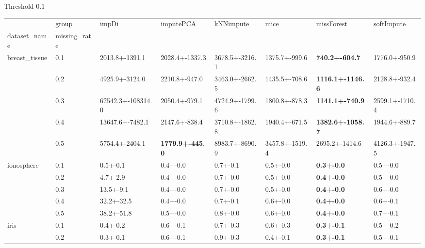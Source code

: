 

 Threshold 0.1 
 \begin{tabular}{llllllll}
\toprule
     & group &              impDi &               imputePCA &       kNNimpute &            mice &               missForest &      softImpute \\
dataset_name & missing_rate &                    &                         &                 &                 &                          &                 \\
\midrule
breast_tissue & 0.1 &     2013.8+-1391.1 &          2028.4+-1337.3 &  3678.5+-3216.1 &   1375.7+-999.6 &    \textbf{740.2+-604.7} &   1776.0+-950.9 \\
     & 0.2 &     4925.9+-3124.0 &           2210.8+-947.0 &  3463.0+-2662.5 &   1435.5+-708.6 &  \textbf{1116.1+-1146.6} &   2128.8+-932.4 \\
     & 0.3 &  62542.3+-108314.0 &           2050.4+-979.1 &  4724.9+-1799.6 &   1800.8+-878.3 &   \textbf{1141.1+-740.9} &  2599.1+-1710.4 \\
     & 0.4 &    13647.6+-7482.1 &           2147.6+-838.4 &  3710.8+-1862.8 &   1940.4+-671.5 &  \textbf{1382.6+-1058.7} &   1944.6+-889.7 \\
     & 0.5 &     5754.4+-2404.1 &  \textbf{1779.9+-445.0} &  8983.7+-8690.9 &  3457.8+-1519.4 &           2695.2+-1414.6 &  4126.3+-1947.5 \\
ionosphere & 0.1 &           0.5+-0.1 &                0.4+-0.0 &        0.7+-0.1 &        0.5+-0.0 &        \textbf{0.3+-0.0} &        0.5+-0.0 \\
     & 0.2 &           4.7+-2.9 &                0.4+-0.0 &        0.7+-0.0 &        0.5+-0.0 &        \textbf{0.4+-0.0} &        0.5+-0.0 \\
     & 0.3 &          13.5+-9.1 &                0.4+-0.0 &        0.7+-0.0 &        0.5+-0.0 &        \textbf{0.4+-0.0} &        0.6+-0.0 \\
     & 0.4 &         32.2+-32.5 &                0.4+-0.0 &        0.7+-0.1 &        0.6+-0.0 &        \textbf{0.4+-0.0} &        0.6+-0.1 \\
     & 0.5 &         38.2+-51.8 &                0.5+-0.0 &        0.8+-0.0 &        0.6+-0.0 &        \textbf{0.4+-0.0} &        0.7+-0.1 \\
iris & 0.1 &           0.4+-0.2 &                0.6+-0.1 &        0.7+-0.3 &        0.6+-0.3 &        \textbf{0.3+-0.1} &        0.5+-0.2 \\
     & 0.2 &           0.3+-0.1 &                0.6+-0.1 &        0.9+-0.3 &        0.4+-0.1 &        \textbf{0.3+-0.1} &        0.5+-0.1 \\

\end{tabular}
